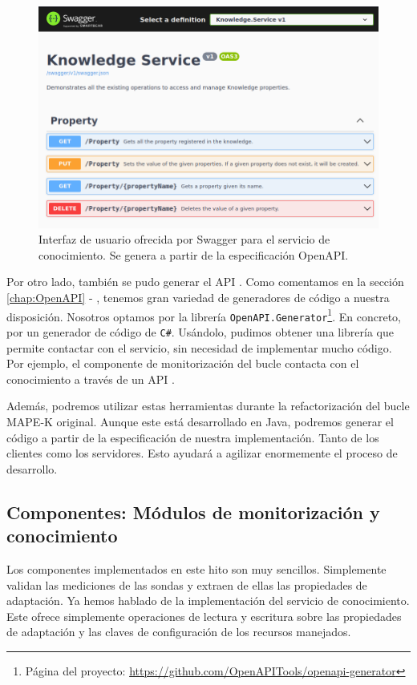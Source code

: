 \begin{figure}[htb]
  \centering
  \includegraphics[scale=1.5]{cap_implementacion/images/swagger-knowledge-ui}
  \caption{Interfaz de usuario ofrecida por Swagger para el servicio de conocimiento. Se genera a partir de la especificación OpenAPI.}
  \label{fig:swagger-knowledge-ui}
\end{figure}

Por otro lado, también se pudo generar el API . Como comentamos en la sección \ref{chap:OpenAPI} - , tenemos gran variedad de generadores de código a nuestra disposición. Nosotros optamos por la librería \texttt{OpenAPI.Generator}\footnote{Página del proyecto: \url{https://github.com/OpenAPITools/openapi-generator}}. En concreto, por un generador de código de \verb|C#|. Usándolo, pudimos obtener una librería que permite contactar con el servicio, sin necesidad de implementar mucho código. Por ejemplo, el componente de monitorización del bucle contacta con el conocimiento a través de un API .

Además, podremos utilizar estas herramientas durante la refactorización del bucle MAPE-K original. Aunque este está desarrollado en Java, podremos generar el código a partir de la especificación de nuestra implementación. Tanto de los clientes como los servidores. Esto ayudará a agilizar enormemente el proceso de desarrollo.

\subsection{Componentes: Módulos de monitorización y conocimiento}

Los componentes implementados en este hito son muy sencillos. Simplemente validan las mediciones de las sondas y extraen de ellas las propiedades de adaptación. Ya hemos hablado de la implementación del servicio de conocimiento. Este ofrece simplemente operaciones de lectura y escritura sobre las propiedades de adaptación y las claves de configuración de los recursos manejados.

